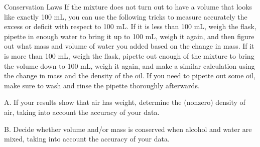 \begin{lab}{Conservation Laws}
If the mixture does not turn out to have a volume that looks
like exactly 100 mL, you can use the following tricks to
measure accurately the excess or deficit with respect to 100
mL.  If it is less than 100 mL, weigh the flask, pipette in
enough water to bring it up to 100 mL, weigh it again, and
then figure out what mass and volume of water you added
based on the change in mass.  If it is more than 100 mL,
weigh the flask, pipette out enough of the mixture to bring
the volume down to 100 mL, weigh it again, and make a
similar calculation using the change in mass and the density
of the oil.  If you need to pipette out some oil, make sure
to wash and rinse the pipette thoroughly afterwards.

\labwriteup

A. If your results show that air has weight, determine the
(nonzero) density of air, taking into account the accuracy of
your data.

B. Decide whether volume and/or mass is conserved when
alcohol and water are mixed, taking into account the accuracy of
your data.

\end{lab}


